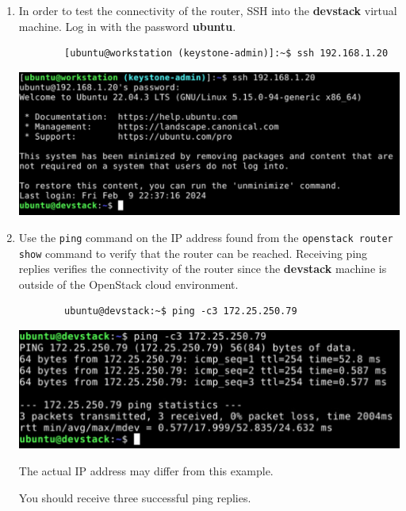 \documentclass[letterpaper, 12pt]{article}
\begin{document}
\begin{enumerate}
    \item In order to test the connectivity of the router, SSH into the \textbf{devstack} virtual machine. Log in with
    the password \textbf{ubuntu}.
    \begin{lstlisting}
        [ubuntu@workstation (keystone-admin)]:~$ ssh 192.168.1.20
    \end{lstlisting}

    \begin{center}
        \includegraphics[width=\linewidth]{images/part2/step16.png}
    \end{center}

    \item Use the \texttt{ping} command on the IP address found from the \texttt{openstack router show} command to
    verify that the router can be reached. Receiving ping replies verifies the connectivity of the router since the
    \textbf{devstack} machine is outside of the OpenStack cloud environment.
    \begin{lstlisting}
        ubuntu@devstack:~$ ping -c3 172.25.250.79
    \end{lstlisting}

    \begin{center}
        \includegraphics[width=\linewidth]{images/part2/step17.png}
    \end{center}

    \begin{notebox}
        The actual IP address may differ from this example.
    \end{notebox}
    \begin{notebox}
        You should receive three successful ping replies.
    \end{notebox}


\end{enumerate}
\end{document}
